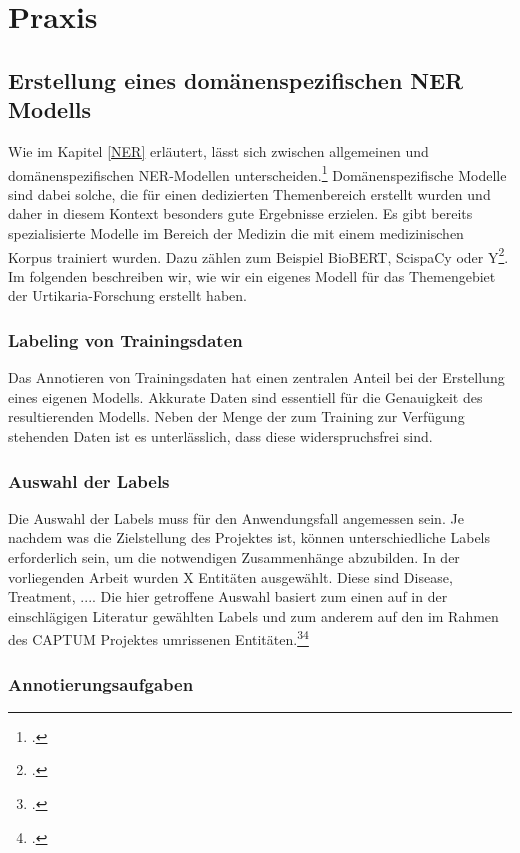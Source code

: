 \newpage
\section{Praxis} \label{latexDetails}
\subsection{Erstellung eines domänenspezifischen NER Modells}
Wie im Kapitel \ref{NER} erläutert, lässt sich zwischen allgemeinen und domänenspezifischen \ac{NER}-Modellen unterscheiden.\footcite[vgl.][S.47]{nouvel2016} Domänenspezifische Modelle sind dabei solche, die für einen dedizierten Themenbereich erstellt wurden und daher in diesem Kontext besonders gute Ergebnisse erzielen.
Es gibt bereits spezialisierte Modelle im Bereich der Medizin die mit einem medizinischen Korpus trainiert wurden. Dazu zählen zum Beispiel BioBERT, ScispaCy oder Y\footcite[S.12]{li2020}. Im folgenden beschreiben wir, wie wir ein eigenes Modell für das Themengebiet der Urtikaria-Forschung erstellt haben.
\subsubsection{Labeling von Trainingsdaten}
Das Annotieren von Trainingsdaten hat einen zentralen Anteil bei der Erstellung eines eigenen Modells. Akkurate Daten sind essentiell für die Genauigkeit des resultierenden Modells. Neben der Menge der zum Training zur Verfügung stehenden Daten ist es unterlässlich, dass diese widerspruchsfrei sind.

\subsubsection{Auswahl der Labels}
Die Auswahl der Labels muss für den Anwendungsfall angemessen sein. Je nachdem was die Zielstellung des Projektes ist, können unterschiedliche Labels erforderlich sein, um die notwendigen Zusammenhänge abzubilden.
In der vorliegenden Arbeit wurden X Entitäten ausgewählt. Diese sind Disease, Treatment, .... Die hier getroffene Auswahl basiert zum einen auf in der einschlägigen Literatur gewählten Labels und zum anderem auf den im Rahmen des CAPTUM Projektes umrissenen Entitäten.\footcite[vgl.][S.]{li2016}\footcite[vgl.][S.]{eickhoff2020}

\subsubsection{Annotierungsaufgaben}

